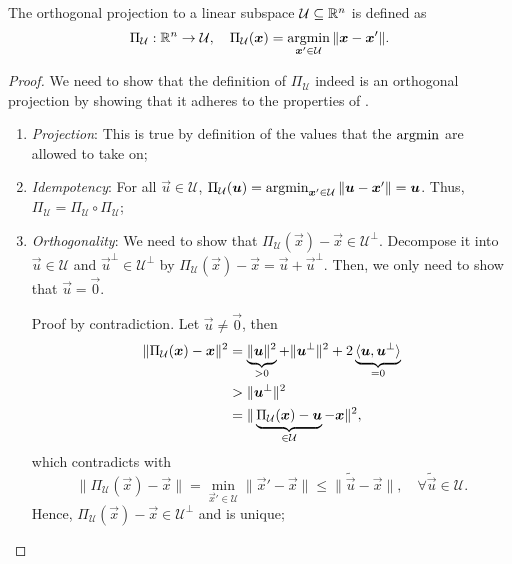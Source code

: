 \begin{definition}
    The orthogonal projection to a linear subspace $\mathcal{U} \subseteq \mathbb{R}^n$ is defined as \[
        \Pi_{\mathcal{U}}: \mathbb{R}^n \to \mathcal{U}, \quad \Pi_{\mathcal{U}}(\bm{x}) = \operatorname*{argmin}_{\bm{x}'\in \mathcal{U}} \|\bm{x}-\bm{x}'\|.
    \]
\end{definition}

\begin{proof}
    We need to show that the definition of $\Pi_{\mathcal{U}}$ indeed is an orthogonal projection
    by showing that it adheres to the properties of .
    \begin{enumerate}
        \item \textit{Projection}: This is true by definition of the values that the $\operatorname*{argmin}$ are allowed to take on;

        \item \textit{Idempotency}: For all $\vec{u}\in \mathcal{U}$, $\Pi_{\mathcal{U}}(\bm{u})
                  = \operatorname*{argmin}_{\bm{x}'\in \mathcal{U}} \| \bm{u} - \bm{x}' \| = \bm{u}$. Thus,
              $\Pi_{\mathcal{U}} = \Pi_{\mathcal{U}} \circ \Pi_{\mathcal{U}}$;

        \item \textit{Orthogonality}: We need to show that $\Pi_{\mathcal{U}}(\vec{x}) - \vec{x} \in
                  \mathcal{U}^\bot$. Decompose it into $\vec{u} \in \mathcal{U}$ and $\vec{u}^\bot \in
                  \mathcal{U}^\bot$ by $\Pi_{\mathcal{U}}(\vec{x}) - \vec{x} = \vec{u} + \vec{u}^\bot$.
              Then, we only need to show that $\vec{u} = \vec{0}$.

              Proof by contradiction. Let $\vec{u} \neq \vec{0}$, then
              \begin{align*}
                  \| \Pi_{\mathcal{U}}(\bm{x}) - \bm{x} \|^2 & = \underbrace{\|\bm{u}\|^2}_{>0} + \|\bm{u}^\bot\|^2 + 2 \underbrace{\langle \bm{u},\bm{u}^\bot \rangle}_{=0} \\
                                                               & > \|\bm{u}^\bot\|^2                                                                                    \\
                                                               & = \|\underbrace{\Pi_{\mathcal{U}}(\bm{x}) - \bm{u}}_{\in \mathcal{U}} - \bm{x}\|^2,
              \end{align*}
              which contradicts with \[
                  \|\Pi_{\mathcal{U}}(\vec{x}) - \vec{x}\| = \min_{\vec{x}' \in \mathcal{U}} \|\vec{x}' - \vec{x}\| \leq \| \tilde{\vec{u}} - \vec{x} \|, \quad \forall \tilde{\vec{u}} \in \mathcal{U}.
              \]
              Hence, $\Pi_{\mathcal{U}}(\vec{x}) - \vec{x} \in \mathcal{U}^\bot$ and is unique;


\end{enumerate}
\end{proof}
